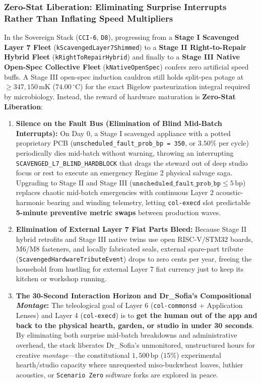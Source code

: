 \subsubsection{Zero-Stat Liberation: Eliminating Surprise Interrupts Rather Than Inflating Speed Multipliers}

In the Sovereign Stack (\texttt{CCI-6}, \texttt{D8}), progressing from a \textbf{Stage I Scavenged Layer 7 Fleet} (\texttt{kScavengedLayer7Shimmed}) to a \textbf{Stage II Right-to-Repair Hybrid Fleet} (\texttt{kRightToRepairHybrid}) and finally to a \textbf{Stage III Native Open-Spec Collective Fleet} (\texttt{kNativeOpenSpec}) confers zero artificial speed buffs. A Stage III open-spec induction cauldron still holds split-pea potage at $\ge 347{,}150\,\mathrm{mK}$ ($74.00\,^\circ\mathrm{C}$) for the exact Bigelow pasteurization integral required by microbiology. Instead, the reward of hardware maturation is \textbf{Zero-Stat Liberation}:

\begin{enumerate}
    \item \textbf{Silence on the Fault Bus (Elimination of Blind Mid-Batch Interrupts):} On Day 0, a Stage I scavenged appliance with a potted proprietary PCB (\texttt{unscheduled\_fault\_prob\_bp = 350}, or $3.50\%$ per cycle) periodically dies mid-batch without warning, throwing an interrupting \texttt{SCAVENGED\_L7\_BLIND\_HARDBLOCK} that drags the steward out of deep studio focus or rest to execute an emergency Regime 2 physical salvage saga. Upgrading to Stage II and Stage III ($\texttt{unscheduled\_fault\_prob\_bp} \le 5\,\mathrm{bp}$) replaces chaotic mid-batch emergencies with continuous Layer 2 acoustic-harmonic bearing and winding telemetry, letting \texttt{col-execd} slot predictable \textbf{5-minute preventive metric swaps} between production waves.
    \item \textbf{Elimination of External Layer 7 Fiat Parts Bleed:} Because Stage II hybrid retrofits and Stage III native twins use open RISC-V/STM32 boards, $\mathrm{M6}$/$\mathrm{M8}$ fasteners, and locally fabricated seals, external spare-part tribute (\texttt{ScavengedHardwareTributeEvent}) drops to zero cents per year, freeing the household from hustling for external Layer 7 fiat currency just to keep its kitchen or workshop running.
    \item \textbf{The 30-Second Interaction Horizon and Dr\_Sofia's Compositional \emph{Montage}:} The teleological goal of Layer 6 (\texttt{col-commonsd} + Application Lenses) and Layer 4 (\texttt{col-execd}) is to \textbf{get the human out of the app and back to the physical hearth, garden, or studio in under 30 seconds}. By eliminating both surprise mid-batch breakdowns and administrative overhead, the stack liberates Dr\_Sofia's unmonitored, unstructured hours for creative \emph{montage}---the constitutional $1{,}500\,\mathrm{bp}$ ($15\%$) experimental hearth/studio capacity where unrequested miso-buckwheat loaves, luthier acoustics, or \texttt{Scenario Zero} software forks are explored in peace.
\end{enumerate}

